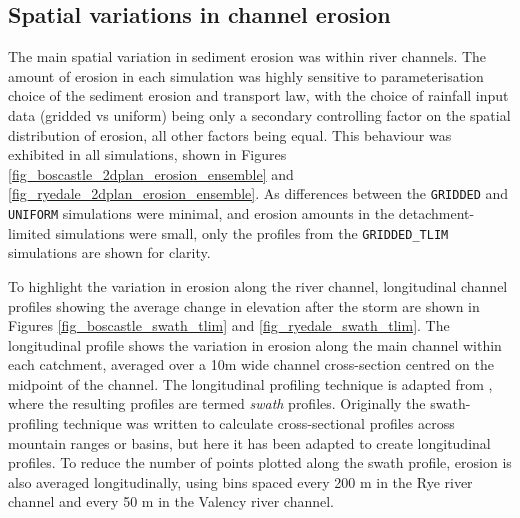 \subsection{Spatial variations in channel erosion}
The main spatial variation in sediment erosion was within river channels. The amount of erosion in each simulation was highly sensitive to parameterisation choice of the sediment erosion and transport law, with the choice of rainfall input data (gridded vs uniform) being only a secondary controlling factor on the spatial distribution of erosion, all other factors being equal. This behaviour was exhibited in all simulations, shown in Figures \ref{fig_boscastle_2dplan_erosion_ensemble} and \ref{fig_ryedale_2dplan_erosion_ensemble}.  As differences between the \texttt{GRIDDED} and \texttt{UNIFORM} simulations were minimal, and erosion amounts in the detachment-limited simulations were small, only the profiles from the \texttt{GRIDDED\_TLIM} simulations are shown for clarity.

To highlight the variation in erosion along the river channel, longitudinal channel profiles showing the average change in elevation after the storm are shown in Figures \ref{fig_boscastle_swath_tlim} and \ref{fig_ryedale_swath_tlim}. The longitudinal profile shows the variation in erosion along the main channel within each catchment, averaged over a 10m wide channel cross-section centred on the midpoint of the channel. The longitudinal profiling technique is adapted from \citep{hergarten2014extracting}, where the resulting profiles are termed \textit{swath} profiles. Originally the swath-profiling technique was written to calculate cross-sectional profiles across mountain ranges or basins, but here it has been adapted to create longitudinal profiles. To reduce the number of points plotted along the swath profile, erosion is also averaged longitudinally, using bins spaced every 200 m in the Rye river channel and every 50 m in the Valency river channel.

